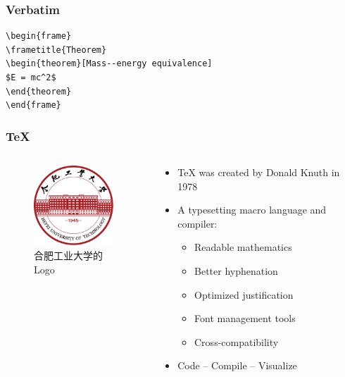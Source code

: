 \documentclass[aspectratio=169]{beamer}
\begin{document}
\begin{frame}[fragile] %
\frametitle{Verbatim}
\begin{example}
\begin{verbatim}
\begin{frame}
\frametitle{Theorem}
\begin{theorem}[Mass--energy equivalence]
$E = mc^2$
\end{theorem}
\end{frame}\end{verbatim}
\end{example}
\end{frame}


\begin{frame}
\frametitle{\TeX{}}
\begin{columns}
\begin{column}{5cm}
	\begin{figure}
		\centering
		\includegraphics[height=3cm]{images/HFUT_badge.pdf}
		\caption{合肥工业大学的Logo}
	\end{figure}
\end{column}
\begin{column}{6cm}
	\begin{itemize}
		\item \TeX{} was created by Donald Knuth in 1978
		\item A typesetting macro language and compiler:
		\begin{itemize}
			\item Readable mathematics
			\item Better hyphenation
			\item Optimized justification
			\item Font management tools
			\item Cross-compatibility
		\end{itemize}
		\item Code -- Compile -- Visualize
	\end{itemize}
\end{column}
\end{columns}
\end{frame}
\end{document}

